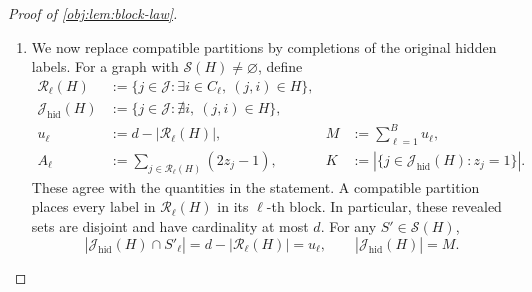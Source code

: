 \begin{proof}[Proof of \cref{obj:lem:block-law}]
\begin{enumerate}
Every \(G(S')\) has \(md\) arrows. The product design yields
\[
\Pr(H,Z=z\mid S=S')
=
\begin{cases}
2^{-n}q^{|H|}(1-q)^{md-|H|},
&S'\in\mathcal S(H),\\
0,&S'\notin\mathcal S(H).
\end{cases}
\]
For a compatible partition, each retained true arrow contributes \(q\), each unretained true arrow contributes \(1-q\), and audit marks on all other pairs integrate to one. For an incompatible partition, an observed arrow outside \(G(S')\) has probability zero. We use the convention \(0^0=1\), so the displayed likelihood also applies at both audit endpoints.

Define
\[
\mu:=\operatorname{Law}(H,Z)
\]
under the actual experiment, averaging over the uniform source partition. On every atom of positive \(\mu\)-mass, the preceding common likelihood and uniform prior give
\[
\Pr(S=S'\mid H,Z=z)
=\frac1{|\mathcal S(H)|}
\qquad(S'\in\mathcal S(H)).
\]
Thus the original conditional record law is the uniform average
\[
\frac1{|\mathcal S(H)|}
\sum_{S'\in\mathcal S(H)}\mathsf K_{S'}(H,z).
\]
When \(\mathcal S(H)\) is empty, assign this expression the zero measure; the corresponding \(\mu\)-atom has mass zero. This convention makes the mixture representation valid over the whole observation space. %

\item We now replace compatible partitions by completions of the original hidden labels. For a graph with \(\mathcal S(H)\ne\varnothing\), define
\[
\begin{aligned}
\mathcal R_\ell(H)
&:=\{j\in\mathcal J:\exists i\in C_\ell,\ (j,i)\in H\},\\
\mathcal J_{\mathrm{hid}}(H)
&:=\{j\in\mathcal J:\nexists i,\ (j,i)\in H\},\\
u_\ell&:=d-|\mathcal R_\ell(H)|,
&
M&:=\sum_{\ell=1}^{B}u_\ell,\\
A_\ell&:=\sum_{j\in\mathcal R_\ell(H)}(2z_j-1),
&
K&:=|\{j\in\mathcal J_{\mathrm{hid}}(H):z_j=1\}|.
\end{aligned}
\]
These agree with the quantities in the statement. A compatible partition places every label in \(\mathcal R_\ell(H)\) in its \(\ell\)-th block. In particular, these revealed sets are disjoint and have cardinality at most \(d\). For any \(S'\in\mathcal S(H)\),
\[
|\mathcal J_{\mathrm{hid}}(H)\cap S'_\ell|
=d-|\mathcal R_\ell(H)|=u_\ell,
\qquad
|\mathcal J_{\mathrm{hid}}(H)|=M.
\]


\end{enumerate}
\end{proof}
